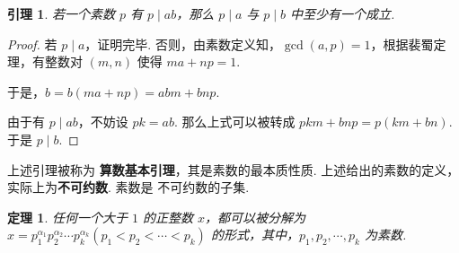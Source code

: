 \documentclass[a4paper]{article}
\newtheorem{theorem}{定理}[section]
\newtheorem{lemma}{引理}[section]
\begin{document}
\begin{lemma}
    若一个素数 $p$ 有 $p\mid ab$，那么 $p\mid a$ 与 $p\mid b$ 中至少有一个成立. 
\end{lemma}

\begin{proof}
    若 $p\mid a$，证明完毕. 否则，由素数定义知，$\gcd(a,p)=1$，根据裴蜀定理，有整数对 $(m,n)$ 使得 $ma+np=1$. 

    于是，$b=b(ma+np)=abm+bnp$. 

    由于有 $p\mid ab$，不妨设 $pk=ab$. 那么上式可以被转成 $pkm+bnp=p(km+bn)$. 于是 $p\mid b$. 
\end{proof}

上述引理被称为 \textbf{算数基本引理}，其是素数的最本质性质. 上述给出的素数的定义，实际上为\textbf{不可约数}. 素数是
不可约数的子集. 

\begin{theorem}
    任何一个大于 $1$ 的正整数 $x$，都可以被分解为 $x=p_1^{\alpha_1}p_2^{\alpha_2}\cdots p_k^{\alpha_k}(p_1<
    p_2<\cdots<p_k)$ 的形式，其中，$p_1,p_2,\cdots,p_k$ 为素数.
\end{theorem}
\end{document}
